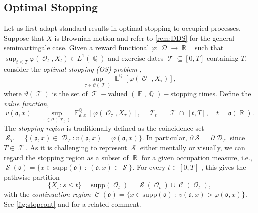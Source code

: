 \documentclass[11pt]{article}
\def\mo{\mathfrak{o}}
\theoremstyle{plain}
\theoremstyle{definition}
\DeclareMathOperator{\E}{\mathbb{E}}
\DeclareMathOperator{\F}{\mathbb{F}}
\DeclareMathOperator{\Q}{\mathbb{Q}}
\DeclareMathOperator{\R}{\mathbb{R}}
\DeclareMathOperator{\calC}{\mathcal{C}}
\DeclareMathOperator{\calD}{\mathcal{D}}
\DeclareMathOperator{\calO}{\mathcal{O}}
\DeclareMathOperator{\calS}{\mathcal{S}}
\DeclareMathOperator{\calT}{\mathcal{T}}
\begin{document}
\subsection{Optimal Stopping}\label{sec:OS}
Let us first adapt standard results in optimal stopping to occupied processes. 
Suppose  that $X$ is Brownian motion and refer to \cref{rem:DDS} for the general semimartingale case.  Given a reward functional $\varphi:\calD \to \R_+$ such that $\sup_{t\le T} \varphi(\calO_t,X_t) \in L^1(\Q)$ and   exercise dates $\calT \subseteq [0,T]$ containing $T$, consider the \textit{optimal stopping (OS) problem} \cite{PeskirShiryaev},  
\begin{equation}\label{eq:OS}
    \sup_{\tau \in \vartheta(\calT)} \E^{\Q}[\varphi(\calO_{\tau},X_\tau)],
\end{equation}  
where $\vartheta(\calT)$ is the set of $\calT-$valued $(\F,\Q)-$stopping times. 
Define the \textit{value function}, 
    \begin{equation}\label{eq:valuefct}
    v(\mo,x) = \sup_{\tau \in \vartheta(\calT_t)} \E^{\Q}_{\mo,x}[\varphi(\calO_{\tau}, X_{\tau}) ], \quad \calT_t = \calT \cap \ [t,T], \quad t = \mo(\R).
\end{equation} The \textit{stopping region} is traditionally defined as the coincidence set  $\calS_T = \{(\mo,x) \in  \calD_T : v(\mo,x) = \varphi(\mo,x)\}$. In particular,   $\partial\calS = \partial\calD_T$ since $T\in \calT$. 
As it is challenging to  
 represent $\calS$ either mentally or  visually, 
we can regard the stopping region as a subset of $\R$  
for a given occupation measure, i.e.,    $\calS(\mo) = \{x\in \text{supp}(\mo) \ : \ (\mo,x) \in \calS \}$.
For every $t
\in [0,T]$ , this gives the pathwise partition 
$$\{X_s  :  s\le t\} = \text{supp}(\calO_t) = \calS(\calO_t) \cup \calC(\calO_t),$$
with the \textit{continuation region} $\calC(\mo) = \{x \in \text{supp}(\mo)\ : \ v(\mo,x) > \varphi(\mo,x)\}$. See \cref{fig:stopcont} and  \cite[Chapter 7]{Detemple} for a related comment.  

\end{document}

